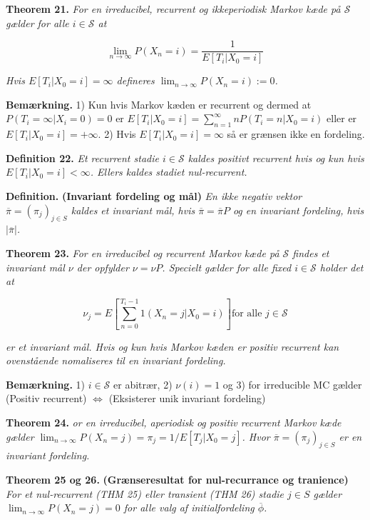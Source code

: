 \documentclass[a4paper,10pt,openany]{book}
\begin{document}
\textbf{Theorem 21.} \emph{For en irreducibel, recurrent og ikkeperiodisk Markov kæde på \(\mathcal{S}\) gælder for alle \(i\in\mathcal{S}\) at}

\[
\lim_{n\to\infty}P(X_n=i)=\frac{1}{E[T_i \vert X_0=i]}
\]

\emph{Hvis \(E[T_i \vert X_0=i]=\infty\) defineres \(\lim_{n\to\infty}P(X_n=i):=0\).}

\textbf{Bemærkning.} 1) Kun hvis Markov kæden er recurrent og dermed at \(P(T_i=\infty \vert X_i=0)=0\) er \(E[T_i \vert X_0=i]=\sum_{n=1}^\infty nP(T_i=n\vert X_0=i)\) eller er \(E[T_i \vert X_0=i]=+\infty\). 2) Hvis \(E[T_i \vert X_0=i]=\infty\) så er grænsen ikke en fordeling.

\textbf{Definition 22.} \emph{Et recurrent stadie \(i\in\mathcal{S}\) kaldes positivt recurrent hvis og kun hvis \(E[T_i \vert X_0=i]<\infty\). Ellers kaldes stadiet nul-recurrent.}

\textbf{Definition.} \textbf{(Invariant fordeling og mål)} \emph{En ikke negativ vektor \(\overline{\pi}=(\pi_j)_{j\in S}\) kaldes et invariant mål, hvis \(\overline{\pi}=\overline{\pi}P\) og en invariant fordeling, hvis \(\vert\overline{\pi}\vert\).}

\textbf{Theorem 23.} \emph{For en irreducibel og recurrent Markov kæde på \(\mathcal{S}\) findes et invariant mål \(\nu\) der opfylder \(\nu =\nu P\). Specielt gælder for alle fixed \(i\in\mathcal{S}\) holder det at}

\[
\nu_j=E\left[\sum_{n=0}^{T_i-1}1(X_n=j \vert X_0=i)\right] \text{for alle } j\in\mathcal{S}
\]

\emph{er et invariant mål. Hvis og kun hvis Markov kæden er positiv recurrent kan ovenstående nomaliseres til en invariant fordeling.}

\textbf{Bemærkning.} 1) \(i\in\mathcal{S}\) er abitrær, 2) \(\nu(i)=1\) og 3) for irreducible MC gælder (Positiv recurrent) \(\Leftrightarrow\) (Eksisterer unik invariant fordeling)

\textbf{Theorem 24.} \emph{or en irreducibel, aperiodisk og positiv recurrent Markov kæde gælder \(\lim_{n\to\infty}P(X_n=j)=\pi_j=1/E[T_j\vert X_0=j]\). Hvor \(\overline{\pi}=(\pi_j)_{j\in S}\) er en invariant fordeling.}

\textbf{Theorem 25 og 26.} \textbf{(Grænseresultat for nul-recurrance og tranience)} \emph{For et nul-recurrent (THM 25) eller transient (THM 26) stadie \(j\in S\) gælder \(\lim_{n\to\infty}P(X_n=j)=0\) for alle valg af initialfordeling \(\overline{\phi}\).}
\end{document}
